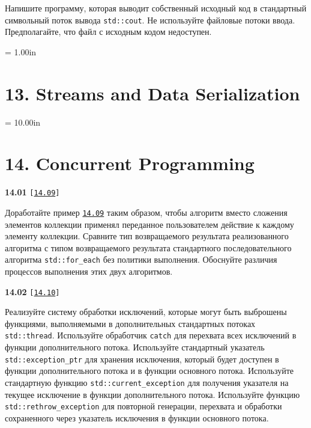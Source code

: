 \documentclass[a4paper,12pt]{article}
\begin{document}
Напишите программу, которая выводит собственный исходный код в стандартный символьный поток вывода \lstinline{std::cout}. Не используйте файловые потоки ввода. Предполагайте, что файл с исходным кодом недоступен.



\newpage\thispagestyle{empty}\pdfpageheight = 1.00in\enlargethispage{100in}

\section{13. Streams and Data Serialization}



\newpage\thispagestyle{empty}\pdfpageheight = 10.00in\enlargethispage{100in}

\section{14. Concurrent Programming}

{\large \textbf{14.01} \texttt{[\href{https://github.com/i-s-m-mipt/Education/blob/master/projects/examples/source/14.09.cpp}{\texttt{14.09}}]}}

\bigskip

Доработайте пример \href{https://github.com/i-s-m-mipt/Education/blob/master/projects/examples/source/14.09.cpp}{\texttt{14.09}} таким образом, чтобы алгоритм вместо сложения элементов коллекции применял переданное пользователем действие к каждому элементу коллекции. Сравните тип возвращаемого результата реализованного алгоритма с типом возвращаемого результата стандартного последовательного алгоритма \lstinline{std::for_each} без политики выполнения. Обоснуйте различия процессов выполнения этих двух алгоритмов.

\bigskip

{\large \textbf{14.02} \texttt{[\href{https://github.com/i-s-m-mipt/Education/blob/master/projects/examples/source/14.10.cpp}{\texttt{14.10}}]}}

\bigskip

Реализуйте систему обработки исключений, которые могут быть выброшены функциями, выполняемыми в дополнительных стандартных потоках \lstinline{std::thread}. Используйте обработчик \lstinline{catch} для перехвата всех исключений в функции дополнительного потока. Используйте стандартный указатель \lstinline{std::exception_ptr} для хранения исключения, который будет доступен в функции дополнительного потока и в функции основного потока. Используйте стандартную функцию \lstinline{std::current_exception} для получения указателя на текущее исключение в функции дополнительного потока. Используйте функцию \lstinline{std::rethrow_exception} для повторной генерации, перехвата и обработки сохраненного через указатель исключения в функции основного потока.
\end{document}
